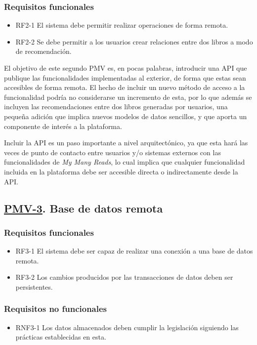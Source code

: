 \subsubsection{Requisitos funcionales}
\begin{itemize}
    \item RF2-1 El sistema debe permitir realizar operaciones de forma remota.
    \item RF2-2 Se debe permitir a los usuarios crear relaciones entre dos libros a modo de recomendación.
\end{itemize}

El objetivo de este segundo PMV es, en pocas palabras, introducir una API que publique las funcionalidades implementadas al exterior, de forma que estas sean accesibles de forma remota. El hecho de incluir un nuevo método de acceso a la funcionalidad podría no considerarse un incremento de esta, por lo que además se incluyen las recomendaciones entre dos libros generadas por usuarios, una pequeña adición que implica nuevos modelos de datos sencillos, y que aporta un componente de interés a la plataforma.

Incluir la API es un paso importante a nivel arquitectónico, ya que esta hará las veces de punto de contacto entre usuarios y/o sistemas externos con las funcionalidades de \textit{My Many Reads}, lo cual implica que cualquier funcionalidad incluida en la plataforma debe ser accesible directa o indirectamente desde la API.

\subsection{\href{https://github.com/Anglepi/My-Many-Reads/milestone/5}{PMV-3}. Base de datos remota}

\subsubsection{Requisitos funcionales}
\begin{itemize}
    \item RF3-1 El sistema debe ser capaz de realizar una conexión a una base de datos remota.
    \item RF3-2 Los cambios producidos por las transacciones de datos deben ser persistentes.
\end{itemize}

\subsubsection{Requisitos no funcionales}
\begin{itemize}
    \item RNF3-1 Los datos almacenados deben cumplir la legislación siguiendo las prácticas establecidas en esta.
\end{itemize}


